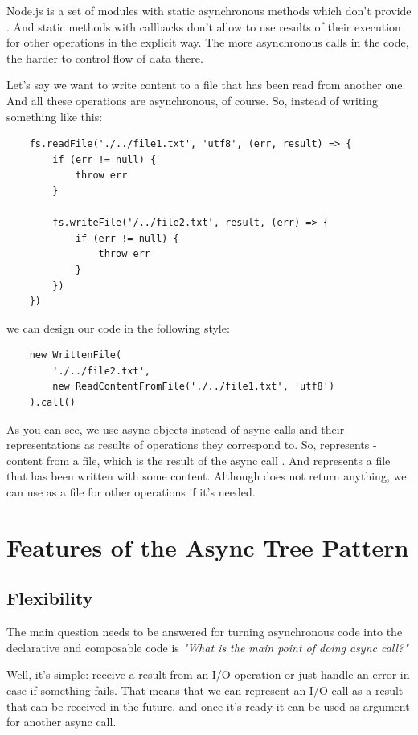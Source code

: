 \documentclass{article}
\begin{document}
Node.js is a set of modules with static asynchronous methods which don't provide . And static methods with callbacks don't allow to use results of their execution for other operations in the explicit way. The more asynchronous calls in the code, the harder to control flow of data there.

Let's say we want to write content to a file that has been read from another one. And all these operations are asynchronous, of course. 
So, instead of writing something like this:


\begin{verbatim}
    fs.readFile('./../file1.txt', 'utf8', (err, result) => {
        if (err != null) {
            throw err
        }
 
        fs.writeFile('/../file2.txt', result, (err) => {
            if (err != null) {
                throw err
            }
        })
    })
\end{verbatim}

we can design our code in the following style:


\begin{verbatim}
    new WrittenFile(
        './../file2.txt',
        new ReadContentFromFile('./../file1.txt', 'utf8')
    ).call()
\end{verbatim}

As you can see, we use async objects instead of async calls and their representations as results of operations they correspond to. So,  represents  - content from a file, which is the result of the async call . And  represents a file that has been written with some content. Although  does not return anything, we can use  as a file for other operations if it's needed.

\section{Features of the Async Tree Pattern}

\subsection{Flexibility}

The main question needs to be answered for turning asynchronous code into the declarative and composable code is \textit{"What is the main point of doing async call?"}

Well, it's simple: receive a result from an I/O operation or just handle an error in case if something fails. That means that we can represent an I/O call as a result that can be received in the future, and once it's ready it can be used as argument for another async call.
\end{document}
